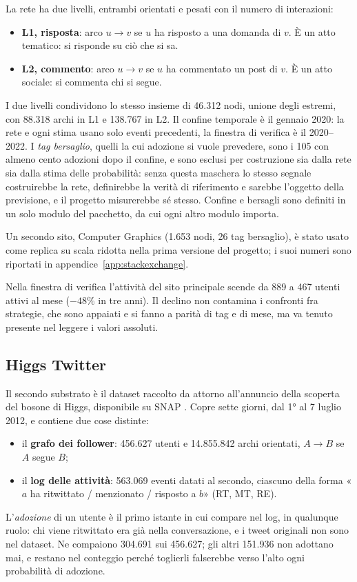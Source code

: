 \documentclass[11pt,a4paper]{article}
\begin{document}
La rete ha due livelli, entrambi orientati e pesati con il numero di interazioni:
\begin{itemize}
  \item \textbf{L1, risposta}: arco $u \to v$ se $u$ ha risposto a una domanda di $v$. È un atto tematico: si risponde su ciò che si sa.
  \item \textbf{L2, commento}: arco $u \to v$ se $u$ ha commentato un post di $v$. È un atto sociale: si commenta chi si segue.
\end{itemize}
I due livelli condividono lo stesso insieme di 46.312 nodi, unione degli estremi, con 88.318 archi in L1 e 138.767 in L2. Il confine temporale è il gennaio 2020: la rete e ogni stima usano solo eventi precedenti, la finestra di verifica è il 2020--2022. I \emph{tag bersaglio}, quelli la cui adozione si vuole prevedere, sono i 105 con almeno cento adozioni dopo il confine, e sono esclusi per costruzione sia dalla rete sia dalla stima delle probabilità: senza questa maschera lo stesso segnale costruirebbe la rete, definirebbe la verità di riferimento e sarebbe l'oggetto della previsione, e il progetto misurerebbe sé stesso. Confine e bersagli sono definiti in un solo modulo del pacchetto, da cui ogni altro modulo importa.

Un secondo sito, Computer Graphics (1.653 nodi, 26 tag bersaglio), è stato usato come replica su scala ridotta nella prima versione del progetto; i suoi numeri sono riportati in appendice~\ref{app:stackexchange}.

Nella finestra di verifica l'attività del sito principale scende da 889 a 467 utenti attivi al mese ($-48\%$ in tre anni). Il declino non contamina i confronti fra strategie, che sono appaiati e si fanno a parità di tag e di mese, ma va tenuto presente nel leggere i valori assoluti.

\subsection{Higgs Twitter}
Il secondo substrato è il dataset raccolto da \citet{dedomenico2013} attorno all'annuncio della scoperta del bosone di Higgs, disponibile su SNAP \citep{snap}. Copre sette giorni, dal 1° al 7 luglio 2012, e contiene due cose distinte:
\begin{itemize}
  \item il \textbf{grafo dei follower}: 456.627 utenti e 14.855.842 archi orientati, $A \to B$ se $A$ segue $B$;
  \item il \textbf{log delle attività}: 563.069 eventi datati al secondo, ciascuno della forma «$a$ ha ritwittato / menzionato / risposto a $b$» (RT, MT, RE).
\end{itemize}
L'\emph{adozione} di un utente è il primo istante in cui compare nel log, in qualunque ruolo: chi viene ritwittato era già nella conversazione, e i tweet originali non sono nel dataset. Ne compaiono 304.691 sui 456.627; gli altri 151.936 non adottano mai, e restano nel conteggio perché toglierli falserebbe verso l'alto ogni probabilità di adozione.
\end{document}
